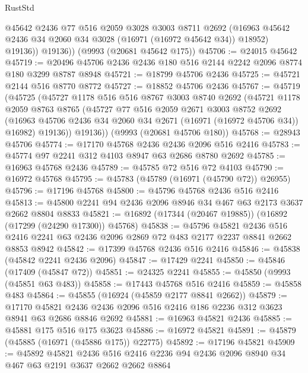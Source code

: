 \begin{lexlean}{RustStd}
\begin{coremodule}
            @45642
            @2436
            @77
            @516
            @2059
            @3028
            @3003
            @8711
            @2692
            (@16963 @45642 @2436 @34 @2060 @34 @3028 (@16971 (@16972 @45642 @34)) @18952)
            @19136))
        @19136))
    (@9993 (@20681 @45642 @175))
@45706 := @24015 @45642
@45719 := @20496 @45706 @2436 @2436 @180 @516 @2144 @2242 @2096 @8774 @180 @3299 @8787 @8948
@45721 := @18799 @45706 @2436
@45725 := @45721 @2144 @516 @8770 @8772
@45727 := @18852 @45706 @2436
@45767 := @45719
    (@45725
      (@45727
        @1178
        @516
        @516
        @8767
        @3003
        @8740
        @2692
        (@45721
          @1178
          @2059
          @8763
          @8765
          (@45727
            @77
            @516
            @2059
            @2671
            @3003
            @8752
            @2692
            (@16963 @45706 @2436 @34 @2060 @34 @2671 (@16971 (@16972 @45706 @34)) @16982)
            @19136))
        @19136))
    (@9993 (@20681 @45706 @180))
@45768 := @28943 @45706
@45774 := @17170 @45768 @2436 @2436 @2096 @516 @2416
@45783 := @45774 @97 @2241 @312 @4103 @8947 @63 @2686 @8780 @2692
@45785 := @16963 @45768 @2436
@45789 := @45785 @72 @516 @72 @4103
@45790 := @16972 @45768
@45795 := @45783 (@45789 (@16971 (@45790 @72)) @26955)
@45796 := @17196 @45768
@45800 := @45796 @45768 @2436 @516 @2416
@45813 := @45800 @2241 @94 @2436 @2096 @8946 @34 @467 @63 @2173 @3637 @2662 @8804 @8833
@45821 := @16892 (@17344 (@20467 @19885)) (@16892 (@17299 (@24290 @17300)) @45768)
@45838 := @45796
    @45821
    @2436
    @516
    @2416
    @2241
    @63
    @2436
    @2096
    @2869
    @72
    @483
    @2177
    @2237
    @8841
    @2662
    @8853
    @8942
@45842 := @17399 @45768 @2436 @516 @2416
@45846 := @45838 (@45842 @2241 @2436 @2096)
@45847 := @17429 @2241
@45850 := @45846 (@17409 (@45847 @72))
@45851 := @24325 @2241
@45855 := @45850 (@9993 (@45851 @63 @483))
@45858 := @17443 @45768 @516 @2416
@45859 := @45858 @483
@45864 := @45855 (@16924 (@45859 @2177 @8841 @2662))
@45879 := @17170
    @45821
    @2436
    @2436
    @2096
    @516
    @2416
    @186
    @2236
    @312
    @3623
    @8941
    @63
    @2686
    @8846
    @2692
@45881 := @16963 @45821 @2436
@45885 := @45881 @175 @516 @175 @3623
@45886 := @16972 @45821
@45891 := @45879 (@45885 (@16971 (@45886 @175)) @22775)
@45892 := @17196 @45821
@45909 := @45892
    @45821
    @2436
    @516
    @2416
    @2236
    @94
    @2436
    @2096
    @8940
    @34
    @467
    @63
    @2191
    @3637
    @2662
    @2662
    @8864

\end{coremodule}
\end{lexlean}
